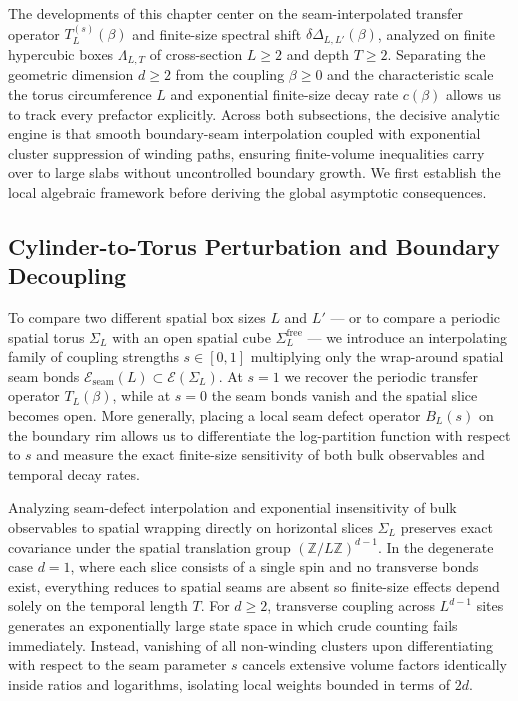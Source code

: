 \documentclass[11pt]{article}
\theoremstyle{definition}
\begin{document}
The developments of this chapter center on the seam-interpolated transfer operator
$T_L^{(s)}(\beta)$ and finite-size spectral shift $\delta\Delta_{L,L'}(\beta)$,
analyzed on finite hypercubic boxes $\Lambda_{L,T}$ of cross-section $L \ge 2$ and
depth $T \ge 2$. Separating the geometric dimension $d \ge 2$ from the coupling
$\beta \ge 0$ and the characteristic scale the torus circumference $L$ and
exponential finite-size decay rate $c(\beta)$ allows us to track every prefactor
explicitly. Across both subsections, the decisive analytic engine is that smooth
boundary-seam interpolation coupled with exponential cluster suppression of winding
paths, ensuring finite-volume inequalities carry over to large slabs without
uncontrolled boundary growth. We first establish the local algebraic framework
before deriving the global asymptotic consequences.

\subsection{Cylinder-to-Torus Perturbation and Boundary Decoupling}
\label{subsec:s09a}

To compare two different spatial box sizes $L$ and $L'$ --- or to compare a periodic
spatial torus $\Sigma_L$ with an open spatial cube $\Sigma_L^{\mathrm{free}}$ --- we
introduce an interpolating family of coupling strengths $s \in [0, 1]$ multiplying
only the wrap-around spatial seam bonds $\mathcal{E}_{\mathrm{seam}}(L) \subset
\mathcal{E}(\Sigma_L)$. At $s = 1$ we recover the periodic transfer operator
$T_L(\beta)$, while at $s = 0$ the seam bonds vanish and the spatial slice becomes
open. More generally, placing a local seam defect operator $B_L(s)$ on the boundary
rim allows us to differentiate the log-partition function with respect to $s$ and
measure the exact finite-size sensitivity of both bulk observables and temporal
decay rates.

Analyzing seam-defect interpolation and exponential insensitivity of bulk
observables to spatial wrapping directly on horizontal slices $\Sigma_L$ preserves
exact covariance under the spatial translation group
$(\mathbb{Z}/L\mathbb{Z})^{d-1}$. In the degenerate case $d = 1$, where each slice
consists of a single spin and no transverse bonds exist, everything reduces to
spatial seams are absent so finite-size effects depend solely on the temporal length
$T$. For $d \ge 2$, transverse coupling across $L^{d-1}$ sites generates an
exponentially large state space in which crude counting fails immediately. Instead,
vanishing of all non-winding clusters upon differentiating with respect to the seam
parameter $s$ cancels extensive volume factors identically inside ratios and
logarithms, isolating local weights bounded in terms of $2d$.
\end{document}
